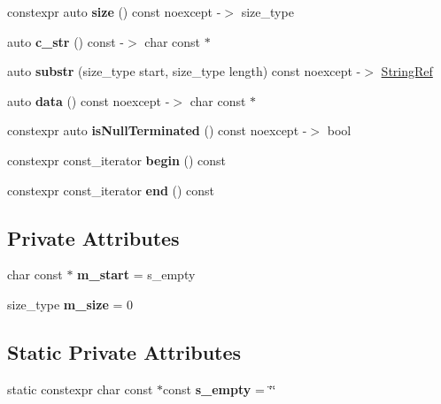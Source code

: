\begin{DoxyCompactItemize}
constexpr auto {\bfseries size} () const noexcept -\/$>$ size\+\_\+type
\item 
\mbox{\label{classCatch_1_1StringRef_a1669cb2765e820ca258159676cbd82a5}} 
auto {\bfseries c\+\_\+str} () const -\/$>$ char const $\ast$
\item 
\mbox{\label{classCatch_1_1StringRef_a594bc3e10ffad77df92f7d1a4c99d7ff}} 
auto {\bfseries substr} (size\+\_\+type start, size\+\_\+type length) const noexcept -\/$>$ \hyperlink{classCatch_1_1StringRef}{String\+Ref}
\item 
\mbox{\label{classCatch_1_1StringRef_ab0f85edde9f97153fc758fac3bb14507}} 
auto {\bfseries data} () const noexcept -\/$>$ char const $\ast$
\item 
\mbox{\label{classCatch_1_1StringRef_a646e58f5f4e1f5e82cfba06d9fd5d016}} 
constexpr auto {\bfseries is\+Null\+Terminated} () const noexcept -\/$>$ bool
\item 
\mbox{\label{classCatch_1_1StringRef_ab0adc7198d60867c2842b998ae456795}} 
constexpr const\+\_\+iterator {\bfseries begin} () const
\item 
\mbox{\label{classCatch_1_1StringRef_a3ce9afc711b559d6cc59666898fc0828}} 
constexpr const\+\_\+iterator {\bfseries end} () const
\end{DoxyCompactItemize}
\subsection*{Private Attributes}
\begin{DoxyCompactItemize}
\item 
\mbox{\label{classCatch_1_1StringRef_a0583d4e5ea88c99c121504052a4fcb6c}} 
char const  $\ast$ {\bfseries m\+\_\+start} = s\+\_\+empty
\item 
\mbox{\label{classCatch_1_1StringRef_a91ee253f5b7e43303352186139845753}} 
size\+\_\+type {\bfseries m\+\_\+size} = 0
\end{DoxyCompactItemize}
\subsection*{Static Private Attributes}
\begin{DoxyCompactItemize}
\item 
\mbox{\label{classCatch_1_1StringRef_a38d077e89f7f2ce666507ab28dd28653}} 
static constexpr char const  $\ast$const {\bfseries s\+\_\+empty} = \char`\"{}\char`\"{}
\end{DoxyCompactItemize}


